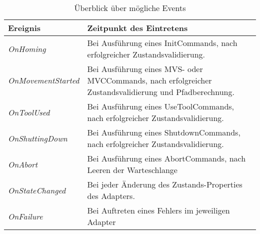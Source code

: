 \begin{table}
\begin{tabular}{|p{5cm}|p{9cm}|}
\hline \rowcolor{lightgray}
\textbf{Ereignis} & \textbf{Zeitpunkt des Eintretens}\\
\hline
\textit{OnHoming} & Bei Ausführung eines InitCommands, nach erfolgreicher Zustandsvalidierung.\\
\hline
\textit{OnMovementStarted} & Bei Ausführung eines MVS- oder MVCCommands, nach erfolgreicher Zustandsvalidierung und Pfadberechnung.\\
\hline
\textit{OnToolUsed} & Bei Ausführung eines UseToolCommands, nach erfolgreicher Zustandsvalidierung.\\
\hline
\textit{OnShuttingDown} & Bei Ausführung eines ShutdownCommands, nach erfolgreicher Zustandsvalidierung.\\
\hline
\textit{OnAbort} & Bei Ausführung eines AbortCommands, nach Leeren der Warteschlange\\ 
\hline
\textit{OnStateChanged} & Bei jeder Änderung des Zustands-Properties des Adapters.\\
\hline
\textit{OnFailure} & Bei Auftreten eines Fehlers im jeweiligen Adapter\\
\hline
\end{tabular}
\caption{Überblick über mögliche Events}
\end{table}

